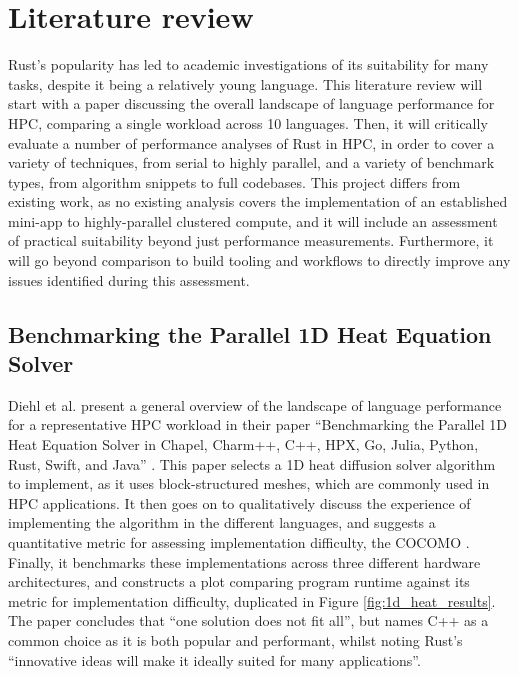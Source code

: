 \section{Literature review}
\label{sec:literature-review}

Rust's popularity has led to academic investigations of its suitability for many tasks, despite it being a relatively young language. This literature review will start with a paper discussing the overall landscape of language performance for \acrshort{HPC}, comparing a single workload across 10 languages. Then, it will critically evaluate a number of performance analyses of Rust in \acrshort{HPC}, in order to cover a variety of techniques, from serial to highly parallel, and a variety of benchmark types, from algorithm snippets to full codebases. This project differs from existing work, as no existing analysis covers the implementation of an established \acrshort{mini-app} to highly-parallel clustered compute, and it will include an assessment of practical suitability beyond just performance measurements. Furthermore, it will go beyond comparison to build tooling and workflows to directly improve any issues identified during this assessment.

\subsection{Benchmarking the Parallel 1D Heat Equation Solver}
\label{ssec:diehl-et-al}

Diehl et al. present a general overview of the landscape of language performance for a representative \acrshort{HPC} workload in their paper ``Benchmarking the Parallel 1D Heat Equation Solver in Chapel, Charm++, C++, HPX, Go, Julia, Python, Rust, Swift, and Java'' \cite{diehlBenchmarkingParallel1D2023}. This paper selects a 1D heat diffusion solver algorithm to implement, as it uses block-structured meshes, which are commonly used in \acrshort{HPC} applications. It then goes on to qualitatively discuss the experience of implementing the algorithm in the different languages, and suggests a quantitative metric for assessing implementation difficulty, the \acrfull{COCOMO} \cite{boehm1995cost}. Finally, it benchmarks these implementations across three different hardware architectures, and constructs a plot comparing program runtime against its metric for implementation difficulty, duplicated in Figure \ref{fig:1d_heat_results}. The paper concludes that ``one solution does not fit all'', but names C++ as a common choice as it is both popular and performant, whilst noting Rust's ``innovative ideas will make it ideally suited for many applications''.

